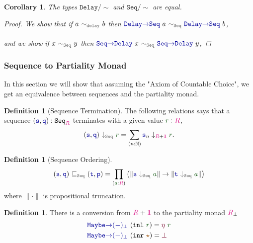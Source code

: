\documentclass[twoside,11pt,openright]{report}
\theoremstyle{plain} %
\newtheorem*{cor}{Corollary}
\theoremstyle{definition}
\newtheorem{defn}[thm]{Definition}%
\theoremstyle{remark}
\newcommand*{\term}[1]{\textcolor{green!30!black}{#1}} %
\newcommand*{\type}[1]{\textcolor{magenta!90!black}{#1}}
\newcommand*{\unit}{\type{\textbf{1}}}
\newcommand*{\relation}[1]{\textcolor{gray!75!black}{\ensuremath{\mathtt{#1}}}}
\newcommand*{\constant}[1]{\textcolor{orange!60!black}{\ensuremath{\mathtt{#1}}}}
\newcommand*{\function}[1]{\textcolor{blue!60!black}{\ensuremath{\mathtt{#1}}}}
\newcommand*{\constructor}[1]{\textcolor{purple!60!black}{\ensuremath{\mathtt{#1}}}}
\newcommand*{\typeformer}[1]{\ensuremath{\mathtt{#1}}}
\newcommand*{\unitelem}{\constant{\star}} %
\begin{document}
\begin{cor}
  The types \(\typeformer{Delay}/\sim\) and \(\typeformer{Seq}/\sim\) are equal.
  \begin{proof}
    We show that if \(a~\relation{\sim_{delay}}~b\) then \(\function{Delay{\rightarrow}Seq}~a~\relation{\sim_{Seq}}~\function{Delay{\rightarrow}Seq}~b\), 
    \\ \\
    and we show if \(x~\relation{\sim_{Seq}}~y\) then \(\function{Seq{\rightarrow}Delay}~x~\relation{\sim_{Seq}}~\function{Seq{\rightarrow}Delay}~y\), 
  \end{proof}
\end{cor}

\subsubsection{Sequence to Partiality Monad}
In this section we will show that assuming the "Axiom of Countable Choice", we get an equivalence between sequences and the partiality monad.
\begin{defn}[Sequence Termination]
  The following relations says that a sequence \((\function{s},\function{q}) : \typeformer{Seq}_{\type{R}}\) terminates with a given value \(\term{r} : \type{R}\),
  \begin{equation}
    (\function{s},\function{q})~\relation{\downarrow_{\mathtt{Seq}}}~\term{r} = \sum_{(n : \mathbb{N})} \function{s}_n \downarrow_{\type{R} + \unit} \term{r}.
  \end{equation}
\end{defn}
\begin{defn}[Sequence Ordering]
  \begin{equation}
    (\function{s},\function{q})~\relation{\sqsubseteq_{\mathtt{Seq}}}~(\function{t},\function{p}) = \prod_{(\term{a} : \type{R})} \left(\|\function{s}~\relation{\downarrow_{\mathtt{Seq}}}~\term{a}\| \rightarrow \| \function{t}~\relation{\downarrow_{\mathtt{Seq}}}~\term{a}\|\right)
  \end{equation}
  where \(\| \cdot \|\) is propositional truncation.
\end{defn}
\begin{defn} There is a conversion from \(\type{R} + \unit\) to the partiality monad \(\type{R}_\bot\)
  \begin{equation}
    \begin{aligned}
      &\function{Maybe{\rightarrow}(-)_\bot}~(\mathtt{inl}~\term{r}) = \constructor{\eta}~\term{r} \\
      &\function{Maybe{\rightarrow}(-)_\bot}~(\mathtt{inr}~\unitelem) = \constructor{\bot}
    \end{aligned}
  \end{equation}
\end{defn}
\end{document}
